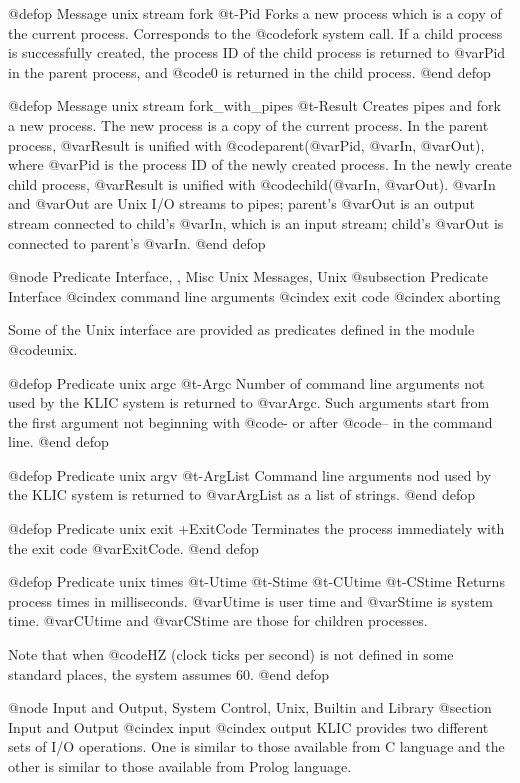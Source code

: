 {{{{@defop {Message} {unix stream} fork @t{-}Pid
Forks a new process which is a copy of the current process.  Corresponds
to the @code{fork} system call.  If a child process is successfully
created, the process ID of the child process is returned to @var{Pid} in
the parent process, and @code{0} is returned in the child process.
@end defop

@defop {Message} {unix stream} fork_with_pipes @t{-}Result
Creates pipes and fork a new process.  The new process is a copy of the
current process.  In the parent process, @var{Result} is unified with
@code{parent(@var{Pid}, @var{In}, @var{Out})}, where @var{Pid} is the
process ID of the newly created process.  In the newly create child
process, @var{Result} is unified with @code{child(@var{In}, @var{Out})}.
@var{In} and @var{Out} are Unix I/O streams to pipes; parent's @var{Out}
is an output stream connected to child's @var{In}, which is an input
stream; child's @var{Out} is connected to parent's @var{In}.
@end defop

@node Predicate Interface,  , Misc Unix Messages, Unix
@subsection Predicate Interface
@cindex command line arguments
@cindex exit code
@cindex aborting

Some of the Unix interface are provided as predicates defined in the
module @code{unix}.

@defop {Predicate} {unix} argc @t{-}Argc
Number of command line arguments not used by the KLIC system is returned
to @var{Argc}.  Such arguments start from the first argument not
beginning with @code{-} or after @code{--} in the command line.
@end defop

@defop {Predicate} {unix} argv @t{-}ArgList
Command line arguments nod used by the KLIC system is returned to
@var{ArgList} as a list of strings.
@end defop

@defop {Predicate} {unix} exit +ExitCode
Terminates the process immediately with the exit code @var{ExitCode}.
@end defop

@defop {Predicate} {unix} times @t{-}Utime @t{-}Stime @t{-}CUtime @t{-}CStime
Returns process times in milliseconds.  @var{Utime} is user time and
@var{Stime} is system time.  @var{CUtime} and @var{CStime} are those for
children processes.

Note that when @code{HZ} (clock ticks per second) is not defined in some
standard places, the system assumes 60.
@end defop

@node Input and Output, System Control, Unix, Builtin and Library
@section Input and Output
@cindex input
@cindex output
KLIC provides two different sets of I/O operations.  One is similar to
those available from C language and the other is similar to those
available from Prolog language.

}}}}
